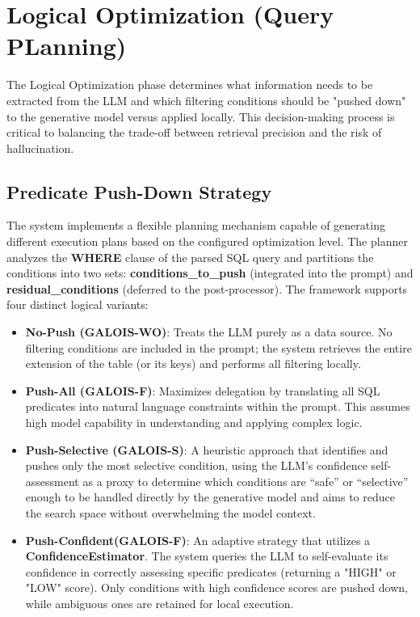 \section{Logical Optimization (Query PLanning)}

The Logical Optimization phase determines what information needs to be extracted from the LLM and which filtering conditions should be "pushed down" to the generative model versus applied locally. This decision-making process is critical to balancing the trade-off between retrieval precision and the risk of hallucination.

\subsection{Predicate Push-Down Strategy}
The system implements a flexible planning mechanism capable of generating different execution plans based on the configured optimization level. The planner analyzes the \textbf{WHERE} clause of the parsed SQL query and partitions the conditions into two sets: \textbf{conditions\_to\_push} (integrated into the prompt) and \textbf{residual\_conditions} (deferred to the post-processor).
The framework supports four distinct logical variants:\begin{itemize}
    \item \textbf{No-Push (GALOIS-WO)}: Treats the LLM purely as a data source. No filtering conditions are included in the prompt; the system retrieves the entire extension of the table (or its keys) and performs all filtering locally.
    \item \textbf{Push-All (GALOIS-F)}: Maximizes delegation by translating all SQL predicates into natural language constraints within the prompt. This assumes high model capability in understanding and applying complex logic.
    \item \textbf{Push-Selective (GALOIS-S)}: A heuristic approach that identifies and pushes only the most selective condition, using the LLM's confidence self-assessment as a proxy to determine which conditions are “safe” or “selective” enough to be handled directly by the generative model and aims to reduce the search space without overwhelming the model context.
    \item \textbf{Push-Confident(GALOIS-F)}: An adaptive strategy that utilizes a \textbf{ConfidenceEstimator}. The system queries the LLM to self-evaluate its confidence in correctly assessing specific predicates (returning a "HIGH" or "LOW" score). Only conditions with high confidence scores are pushed down, while ambiguous ones are retained for local execution.
\end{itemize}

